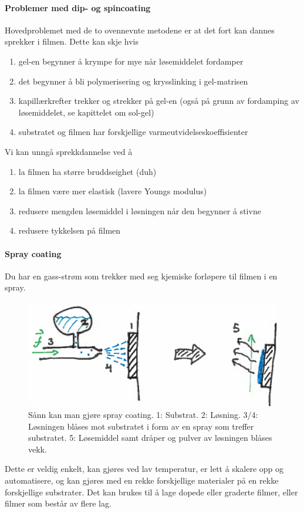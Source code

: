 \paragraph{Problemer med dip- og spincoating} Hovedproblemet med de to ovennevnte metodene er at det fort kan dannes sprekker i filmen. Dette kan skje hvis
\begin{enumerate}
	\item gel-en begynner å krympe for mye når løsemiddelet fordamper
	\item det begynner å bli polymerisering og krysslinking i gel-matrisen
	\item kapillærkrefter trekker og strekker på gel-en (også på grunn av fordamping av løsemiddelet, se kapittelet om sol-gel)
	\item substratet og filmen har forskjellige varmeutvidelseskoeffisienter
\end{enumerate}
Vi kan unngå sprekkdannelse ved å
\begin{enumerate}
	\item la filmen ha større bruddseighet (duh)
	\item la filmen være mer elastisk (lavere Youngs modulus)
	\item redusere mengden løsemiddel i løsningen når den begynner å stivne
	\item redusere tykkelsen på filmen
\end{enumerate}

\paragraph{Spray coating} Du har en gass-strøm som trekker med seg kjemiske forløpere til filmen i en spray.
\begin{figure}[H]
\bmd\centering
\includegraphics[width=0.7\linewidth]{metodefigs/spraycoat.png}
\caption{Sånn kan man gjøre spray coating. 1: Substrat. 2: Løsning. 3/4: Løsningen blåses mot substratet i form av en spray som treffer substratet. 5: Løsemiddel samt dråper og pulver av løsningen blåses vekk.}
\emd\end{figure}
Dette er veldig enkelt, kan gjøres ved lav temperatur, er lett å skalere opp og automatisere, og kan gjøres med en rekke forskjellige materialer på en rekke forskjellige substrater. Det kan brukes til å lage dopede eller graderte filmer, eller filmer som består av flere lag.

